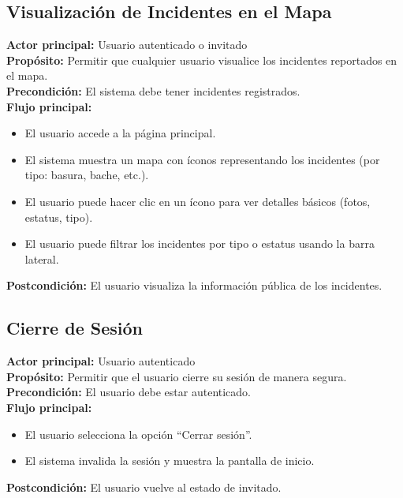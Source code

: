 \subsection{Visualización de Incidentes en el Mapa}
\textbf{Actor principal:} Usuario autenticado o invitado\\
\textbf{Propósito:} Permitir que cualquier usuario visualice los incidentes reportados en el mapa.\\
\textbf{Precondición:} El sistema debe tener incidentes registrados.\\
\textbf{Flujo principal:}
\begin{itemize}
    \item El usuario accede a la página principal.
    \item El sistema muestra un mapa con íconos representando los incidentes (por tipo: basura, bache, etc.).
    \item El usuario puede hacer clic en un ícono para ver detalles básicos (fotos, estatus, tipo).
    \item El usuario puede filtrar los incidentes por tipo o estatus usando la barra lateral.
\end{itemize}
\textbf{Postcondición:} El usuario visualiza la información pública de los incidentes.

\subsection{Cierre de Sesión}
\textbf{Actor principal:} Usuario autenticado\\
\textbf{Propósito:} Permitir que el usuario cierre su sesión de manera segura.\\
\textbf{Precondición:} El usuario debe estar autenticado.\\
\textbf{Flujo principal:}
\begin{itemize}
    \item El usuario selecciona la opción ``Cerrar sesión''.
    \item El sistema invalida la sesión y muestra la pantalla de inicio.
\end{itemize}
\textbf{Postcondición:} El usuario vuelve al estado de invitado.


